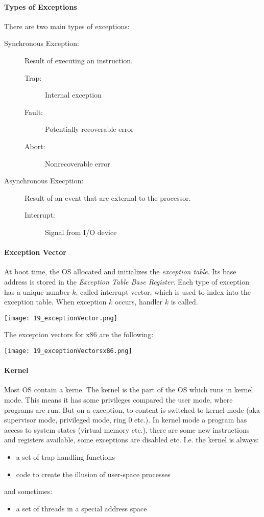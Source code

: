 \paragraph{Types of Exceptions}
There are two main types of exceptions:
\begin{description}
    \item[Synchronous Exception:] Result of executing an instruction.
        \begin{description}
            \item[Trap:] Internal exception
            \item[Fault:] Potentially recoverable error
            \item[Abort:] Nonrecoverable error
        \end{description}
    \item[Asynchronous Execption:] Result of an event that are external to the processor.
        \begin{description}
            \item[Interrupt:] Signal from I/O device
        \end{description}
\end{description}

\paragraph{Exception Vector}
At boot time, the OS allocated and initializes the \textit{exception table}. Its base address is stored in the \textit{Exception Table Base Register}. Each type of exception has a unique number $k$, called interrupt vector, which is used to index into the exception table. When exception $k$ occurs, handler $k$ is called.

\texttt{[image: 19\_exceptionVector.png]}

The exception vectors for x86 are the following:

\texttt{[image: 19\_exceptionVectorsx86.png]}

\paragraph{Kernel}
Most OS contain a kerne. The kernel is the part of the OS which runs in kernel mode. This means it has some privileges compared the user mode, where programs are run. But on a exception, to content is switched to kernel mode (aka supervisor mode, privileged mode, ring $0$ etc.). In kernel mode a program has access to system states (virtual memory etc.), there are some new instructions and registers available, some exceptions are disabled etc.
I.e. the kernel is always:
\begin{itemize}
    \item a set of trap handling functions
    \item code to create the illusion of user-space processes
\end{itemize}
and sometimes:
\begin{itemize}
    \item a set of threads in a special address space
\end{itemize}

